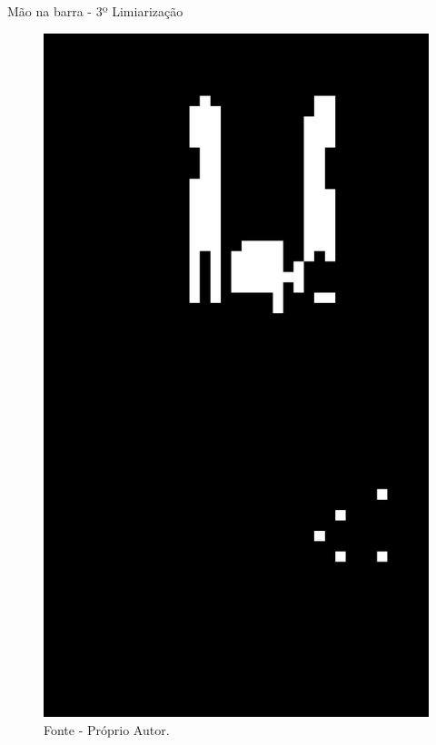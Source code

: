 \begin{frame}{Mão na barra - 3º Limiarização}
    \begin{figure}[!ht]
    \centering
    \includegraphics[scale=0.1]{img/desenvolvimento/maoBarra/limited3.png}
    \caption*{Fonte - Próprio Autor.}
    \end{figure}
\end{frame}

